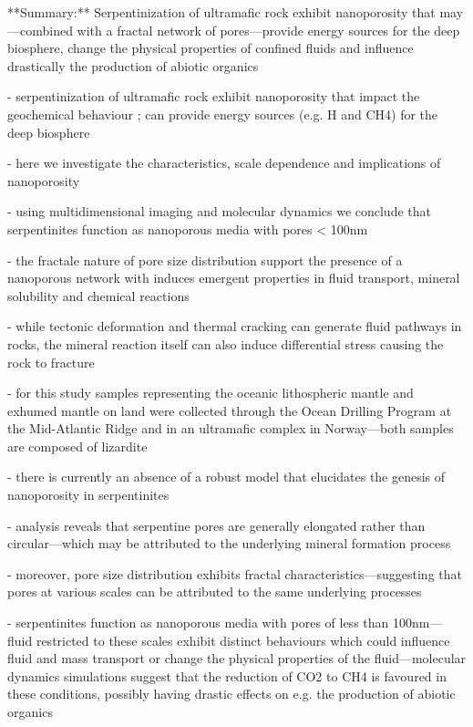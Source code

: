 \documentclass[11pt]{article}
\begin{document}
\begin{markdown}

**Summary:** Serpentinization of ultramafic rock exhibit nanoporosity that may—combined with a fractal network of pores—provide energy sources for the deep biosphere, change the physical properties of confined fluids and influence drastically the production of abiotic organics

- serpentinization of ultramafic rock exhibit nanoporosity that impact the geochemical behaviour ; can provide energy sources (e.g. H and CH4) for the deep biosphere
    
- here we investigate the characteristics, scale dependence and implications of nanoporosity
    
- using multidimensional imaging and molecular dynamics we conclude that serpentinites function as nanoporous media with pores < 100nm
    
- the fractale nature of pore size distribution support the presence of a nanoporous network with induces emergent properties in fluid transport, mineral solubility and chemical reactions
    
- while tectonic deformation and thermal cracking can generate fluid pathways in rocks, the mineral reaction itself can also induce differential stress causing the rock to fracture
    
- for this study samples representing the oceanic lithospheric mantle and exhumed mantle on land were collected through the Ocean Drilling Program at the Mid-Atlantic Ridge and in an ultramafic complex in Norway—both samples are composed of lizardite
    
- there is currently an absence of a robust model that elucidates the genesis of nanoporosity in serpentinites
    
- analysis reveals that serpentine pores are generally elongated rather than circular—which may be attributed to the underlying mineral formation process
    
- moreover, pore size distribution exhibits fractal characteristics—suggesting that pores at various scales can be attributed to the same underlying processes
    
- serpentinites function as nanoporous media with pores of less than 100nm—fluid restricted to these scales exhibit distinct behaviours which could influence fluid and mass transport or change the physical properties of the fluid—molecular dynamics simulations suggest that the reduction of CO2 to CH4 is favoured in these conditions, possibly having drastic effects on e.g. the production of abiotic organics
    
\end{markdown}
\end{document}

